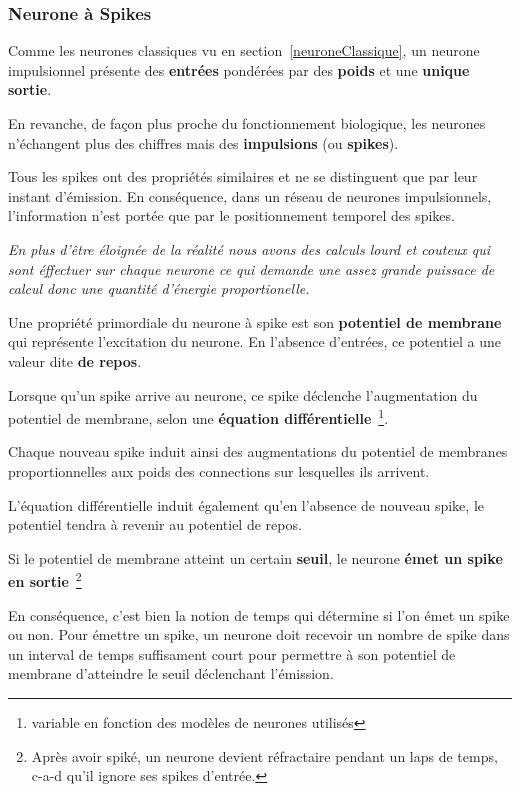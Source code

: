 \subsubsection{Neurone à Spikes}
\label{neuroneSpike}

Comme les neurones classiques vu en section~\ref{neuroneClassique}, un neurone impulsionnel présente des \textbf{entrées} pondérées par des \textbf{poids} et une \textbf{unique sortie}.

En revanche, de façon plus proche du fonctionnement biologique, les neurones n'échangent plus des chiffres mais des \textbf{impulsions} (ou \textbf{spikes}).

Tous les spikes ont des propriétés similaires et ne se distinguent que par leur instant d'émission. En conséquence, dans un réseau de neurones impulsionnels, l'information n'est portée que par le positionnement temporel des spikes.

\textit{En plus d'être éloignée de la réalité nous avons des calculs lourd et couteux qui sont éffectuer sur chaque neurone ce qui demande une assez grande puissace de calcul donc une quantité d'énergie proportionelle.}

Une propriété primordiale du neurone à spike est son \textbf{potentiel de membrane} qui représente l'excitation du neurone.
En l'absence d'entrées, ce potentiel a une valeur dite \textbf{de repos}.

Lorsque qu'un spike arrive au neurone, ce spike déclenche l'augmentation du potentiel de membrane, selon une \textbf{équation différentielle}~\footnote{variable en fonction des modèles de neurones utilisés}.

Chaque nouveau spike induit ainsi des augmentations du potentiel de membranes proportionnelles aux poids des connections sur lesquelles ils arrivent.

L'équation différentielle induit également qu'en l'absence de nouveau spike, le potentiel tendra à revenir au potentiel de repos.

Si le potentiel de membrane atteint un certain \textbf{seuil}, le neurone \textbf{émet un spike en sortie}~\footnote{Après avoir spiké, un neurone devient réfractaire pendant un laps de temps, c-a-d qu'il ignore ses spikes d'entrée.}

En conséquence, c'est bien la notion de temps qui détermine si l'on émet un spike ou non. Pour émettre un spike, un neurone doit recevoir un nombre de spike dans un interval de temps suffisament court  pour permettre à son potentiel de membrane d'atteindre le seuil déclenchant l'émission.

